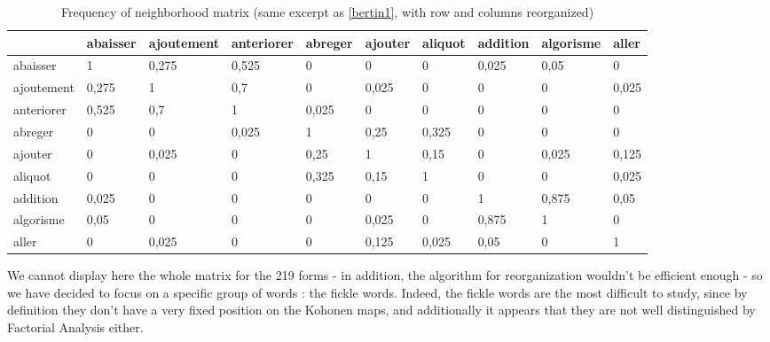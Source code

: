 \documentclass[runningheads,a4paper]{llncs}
\begin{document}
\begin{table}
\begin{tabular}{|l|l|l|l|l|l|l|l|l|l|}
\hline
 & abaisser & ajoutement & anteriorer& abreger & ajouter & aliquot & addition & algorisme & aller \\ \hline
abaisser  & \cellcolor{gris} 1 & \cellcolor{gris} 0,275 & \cellcolor{gris} 0,525 & 0 & 0 & 0 & \cellcolor{grisclair} 0,025 & \cellcolor{grisclair} 0,05 & 0 \\ \hline
ajoutement  & \cellcolor{gris} 0,275 & \cellcolor{gris} 1 & \cellcolor{gris} 0,7 & 0 & \cellcolor{grisclair} 0,025 & 0 & 0 & 0 & \cellcolor{grisclair} 0,025 \\ \hline
anteriorer & \cellcolor{gris} 0,525 & \cellcolor{gris} 0,7 & \cellcolor{gris} 1 & \cellcolor{grisclair} 0,025 & 0 & 0 & 0 & 0 & 0 \\ \hline
abreger & 0 & 0 &\cellcolor{grisclair} 0,025& \cellcolor{gris} 1 & \cellcolor{gris} 0,25 & \cellcolor{gris} 0,325 & 0 & 0 & 0 \\ \hline
ajouter & 0 & \cellcolor{grisclair} 0,025 & 0& \cellcolor{gris} 0,25 & \cellcolor{gris} 1 & \cellcolor{grisclair} 0,15 & 0 & \cellcolor{grisclair} 0,025 & \cellcolor{grisclair} 0,125 \\ \hline
aliquot & 0 & 0 & 0& \cellcolor{gris} 0,325 & \cellcolor{grisclair} 0,15 & \cellcolor{gris} 1 & 0 & 0 & \cellcolor{grisclair} 0,025 \\ \hline
addition & \cellcolor{grisclair} 0,025 & 0 & 0& 0 & 0 & 0 & \cellcolor{gris} 1 & \cellcolor{gris} 0,875 & \cellcolor{grisclair} 0,05 \\ \hline
algorisme & \cellcolor{grisclair} 0,05 & 0 & 0& 0 & \cellcolor{grisclair} 0,025 & 0 & \cellcolor{gris} 0,875 & \cellcolor{gris} 1 & 0 \\ \hline
aller & 0 & \cellcolor{grisclair} 0,025 & 0& 0 & \cellcolor{grisclair} 0,125 & \cellcolor{grisclair} 0,025 & \cellcolor{grisclair} 0,05 & 0 & \cellcolor{gris} 1 \\ \hline
\end{tabular}


\caption{Frequency of neighborhood matrix (same excerpt as \ref{bertin1}, with row and columns reorganized)}
\label{bertin2}
\end{table}

We cannot display here the whole matrix for the 219 forms - in addition, the algorithm for reorganization wouldn't be efficient enough - so we have decided to focus on a specific group of words : the fickle words. Indeed, the fickle words are the most difficult to study, since by definition they don't have a very fixed position on the Kohonen maps, and additionally it appears that they are not well distinguished by Factorial Analysis either.
\end{document}
